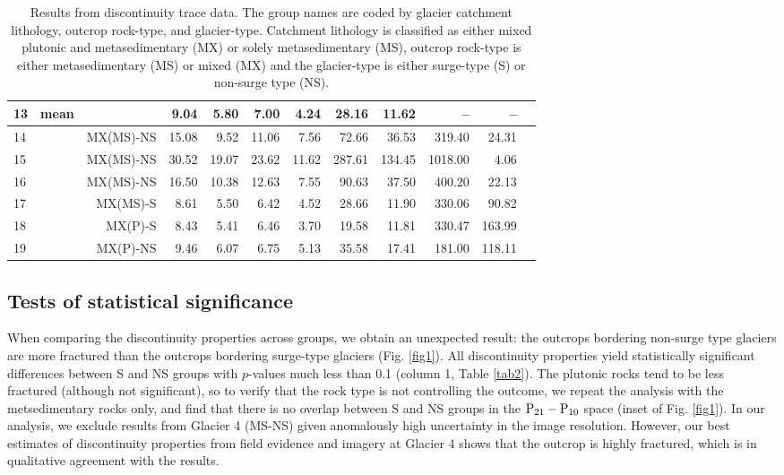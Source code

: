\documentclass[draft,linenumbers]{agujournal}
\begin{document}
\begin{table}[H]
{\begin{tabular}{l l r r r r r r r r r r}
13 &mean&  &9.04&5.80&7.00&4.24&28.16&11.62&--&--\\\hline
14&& MX(MS)-NS &15.08&9.52&11.06&7.56&72.66&36.53&319.40&24.31\\\hline
15&&MX(MS)-NS & 30.52&19.07&23.62&11.62&287.61&134.45&1018.00&4.06\\\hline
16&& MX(MS)-NS &16.50&10.38&12.63&7.55&90.63&37.50&400.20&22.13\\\hline
17&& MX(MS)-S &8.61&5.50&6.42&4.52&28.66&11.90&330.06&90.82\\\hline
18&& MX(P)-S &8.43&5.41&6.46&3.70&19.58&11.81&330.47&163.99\\\hline
19&& MX(P)-NS &9.46&6.07&6.75&5.13&35.58&17.41&181.00&118.11\\\hline

\end{tabular}}
\caption{Results from discontinuity trace data. The group names are coded by glacier catchment lithology, outcrop rock-type, and glacier-type. Catchment lithology is classified as either mixed plutonic and metasedimentary (MX) or solely metasedimentary (MS), outcrop rock-type is either metasedimentary (MS) or mixed (MX) and the glacier-type is either surge-type (S) or non-surge type (NS).}
\label{tab1}
\end{table}



\subsection{Tests of statistical significance}

When comparing the discontinuity properties across groups, we obtain an unexpected result: the outcrops bordering non-surge type glaciers are more fractured than the outcrops bordering surge-type glaciers (Fig. \ref{fig1}). All discontinuity properties yield statistically significant differences between S and NS groups with $p$-values much less than 0.1 (column 1, Table \ref{tab2}). The plutonic rocks tend to be less fractured (although not significant), so to verify that the rock type is not controlling the outcome, we repeat the analysis with the metsedimentary rocks only, and find that there is no overlap between S and NS groups in the $\rm P_{21}-P_{10}$ space (inset of Fig. \ref{fig1}). In our analysis, we exclude results from Glacier 4 (MS-NS) given anomalously high uncertainty in the image resolution. However, our best estimates of discontinuity properties from field evidence and imagery at Glacier 4 shows that the outcrop is highly fractured, which is in qualitative agreement with the results.
\end{document}
